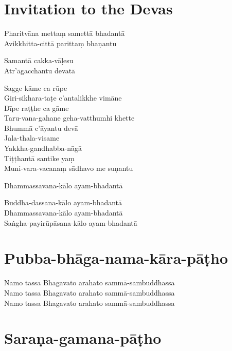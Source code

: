 
\chapter{Invitation to the Devas}%

\begin{paritta}
%
Pharitvāna mettaṃ samettā bhadantā\\
Avikkhitta-cittā parittaṃ bhaṇantu

%
Samantā cakka-vāḷesu\\
Atr'āgacchantu devatā

Sagge kāme ca rūpe\\
Giri-sikhara-taṭe c'antalikkhe vimāne\\
Dīpe raṭṭhe ca gāme\\
Taru-vana-gahane geha-vatthumhi khette\\
Bhummā c'āyantu devā\\
Jala-thala-visame\\
Yakkha-gandhabba-nāgā\\
Tiṭṭhantā santike yaṃ\\
Muni-vara-vacanaṃ sādhavo me suṇantu

Dhammassavana-kālo ayam-bhadantā


Buddha-dassana-kālo ayam-bhadantā\\
Dhammassavana-kālo ayam-bhadantā\\
Saṅgha-payirūpāsana-kālo ayam-bhadantā
\end{paritta}

\chapter{Pubba-bhāga-nama-kāra-pāṭho}%

\begin{paritta}
Namo tassa Bhagavato arahato sammā-sambuddhassa\\
Namo tassa Bhagavato arahato sammā-sambuddhassa\\
Namo tassa Bhagavato arahato sammā-sambuddhassa
\end{paritta}

\clearpage

\chapter{Saraṇa-gamana-pāṭho}%

